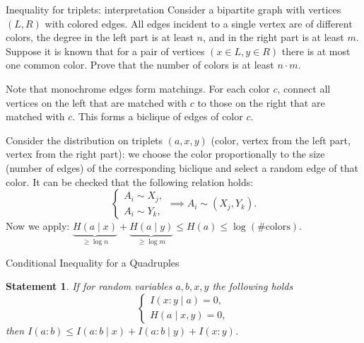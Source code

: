 \documentclass[handout,aspectratio=169]{beamer}
\newtheorem{statement}{Statement}
\begin{document}
    \begin{frame}{Inequality for triplets: interpretation}
        Consider a bipartite graph with vertices \((L, R)\) with colored edges.
        All edges incident to a single vertex are of different colors, the degree in the left part is at least \(n\),
        and in the right part is at least \(m\). Suppose it is known that for a pair of vertices \((x \in L, y \in R)\)
        there is at most one common color. Prove that the number of colors is at least \(n \cdot m\).

        Note that monochrome edges form matchings. For each color \(c\), connect all
        vertices on the left that are matched with \(c\) to those on the right that are matched with \(c\). This forms a biclique of
        edges of color \(c\).

        Consider the distribution on triplets \((a, x, y)\) (color, vertex from the left part, vertex from the right
        part): we choose the color proportionally to the size (number of edges) of the corresponding biclique and
        select a random edge of that color. It can be checked that the following relation holds:
    \[
        \begin{cases}
            A_i \sim X_j,\\
            A_i \sim Y_k,
        \end{cases} \implies A_i \sim (X_j, Y_k).
    \]
    Now we apply: \(\underbrace{H(a \mid x)}_{\ge \log n} +
                      \underbrace{H(a \mid y)}_{\ge \log m} \le H(a) \le \log (\text{\# colors})\).
    \end{frame}

    \begin{frame}{Conditional Inequality for a Quadruples}
		\begin{statement}
		    If for random variables \(a, b, x, y\) the following holds
		    \[
		        \begin{cases}
		            I(x:y \mid a) = 0,\\
		            H(a \mid x, y) = 0,
		        \end{cases}
		    \]
		    then \(I(a:b) \le I(a:b \mid x) + I(a:b \mid y) + I(x:y)\).
		\end{statement}
    \end{frame}
\end{document}
